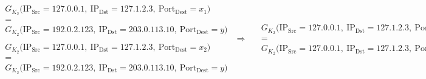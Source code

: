 \documentclass{standalone}
\begin{document}
\begin{minipage}{19.8cm}
\[
	\begin{aligned}
		 &
		\begin{aligned}
			 & \begin{array}{c}
				   G_{K_2}\bigl(\text{IP}_{\text{Src}} = 127.0.0.1,\ \text{IP}_{\text{Dst}} = 127.1.2.3,\ \text{Port}_{\text{Dest}} = x_1 \bigr) \\[0.3em]
				   =                                                                                                                             \\[0.3em]
				   G_{K_2}\bigl(\text{IP}_{\text{Src}} = 192.0.2.123,\ \text{IP}_{\text{Dst}} = 203.0.113.10,\ \text{Port}_{\text{Dest}} = y \bigr)
			   \end{array}
			\\[1em]
			 & \begin{array}{c}
				   G_{K_2}\bigl(\text{IP}_{\text{Src}} = 127.0.0.1,\ \text{IP}_{\text{Dst}} = 127.1.2.3,\ \text{Port}_{\text{Dest}} = x_2 \bigr) \\[0.3em]
				   =                                                                                                                             \\[0.3em]
				   G_{K_2}\bigl(\text{IP}_{\text{Src}} = 192.0.2.123,\ \text{IP}_{\text{Dst}} = 203.0.113.10,\ \text{Port}_{\text{Dest}} = y \bigr)
			   \end{array}
		\end{aligned}
		\Longrightarrow
		\begin{aligned}
			 & \begin{array}{c}
				   G_{K_2}\bigl(\text{IP}_{\text{Src}} = 127.0.0.1,\ \text{IP}_{\text{Dst}} = 127.1.2.3,\ \text{Port}_{\text{Dest}} = x_1 \bigr) \\[0.3em]
				   =                                                                                                                             \\[0.3em]
				   G_{K_2}\bigl(\text{IP}_{\text{Src}} = 127.0.0.1,\ \text{IP}_{\text{Dst}} = 127.1.2.3,\ \text{Port}_{\text{Dest}} = x_2 \bigr)
			   \end{array}
		\end{aligned}
	\end{aligned}
\]
\end{minipage}
\end{document}
